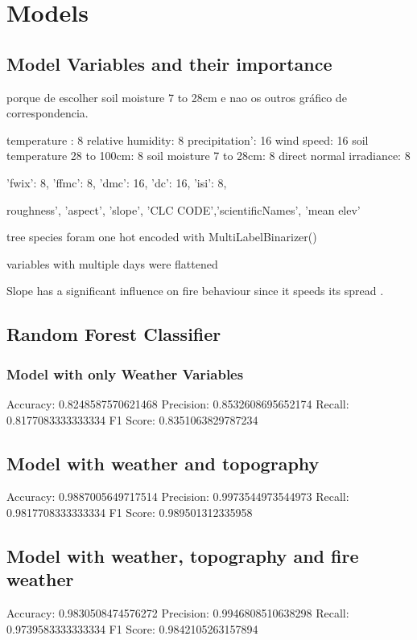 \section{Models}


\subsection{Model Variables and their importance}

porque de escolher soil moisture 7 to 28cm e nao os outros gráfico de correspondencia.

temperature : 8
relative humidity: 8
precipitation': 16
wind speed: 16
soil temperature 28 to 100cm: 8
soil moisture 7 to 28cm: 8
direct normal irradiance: 8

'fwix': 8,
'ffmc': 8,
'dmc': 16,
'dc': 16,
'isi': 8,

roughness', 'aspect', 'slope', 'CLC CODE','scientificNames', 'mean elev'

tree species foram one hot encoded with MultiLabelBinarizer()

variables with multiple days were flattened

Slope has a significant influence on fire behaviour since it speeds its spread \cite{Marques2011}.


\subsection{Random Forest Classifier}



\subsubsection{Model with only Weather Variables}

Accuracy: 0.8248587570621468
Precision: 0.8532608695652174
Recall: 0.8177083333333334
F1 Score: 0.8351063829787234


\subsection{Model with weather and topography}

Accuracy: 0.9887005649717514
Precision: 0.9973544973544973
Recall: 0.9817708333333334
F1 Score: 0.989501312335958

\subsection{Model with weather, topography and fire weather}

Accuracy: 0.9830508474576272
Precision: 0.9946808510638298
Recall: 0.9739583333333334
F1 Score: 0.9842105263157894






